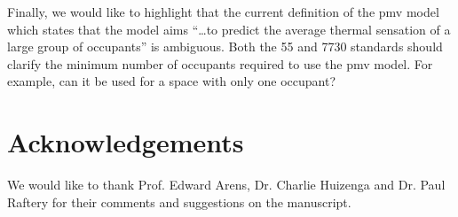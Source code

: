 Finally, we would like to highlight that the current definition of the \ac{pmv} model which states that the model aims ``\ldots to predict the average thermal sensation of a large group of occupants'' is ambiguous.
Both the \gls{55} and \gls{7730} standards should clarify the minimum number of occupants required to use the \ac{pmv} model.
For example, can it be used for a space with only one occupant?

\section*{Acknowledgements}\label{sec:acknowledgements}
We would like to thank Prof. Edward Arens, Dr. Charlie Huizenga and Dr. Paul Raftery for their comments and suggestions on the manuscript.